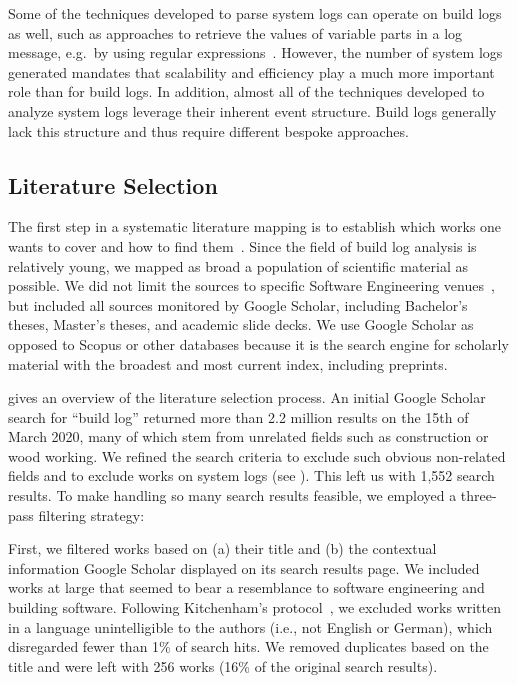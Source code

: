 Some of the techniques developed to parse system logs can operate
on build logs as well, such as approaches to retrieve the
values of variable parts in a log message, e.g.\, by using regular
expressions~\citep{nagappan2010abstracting,xu2009detecting}.
However, the number of
system logs generated mandates that scalability and efficiency play a
much more important role than for build logs.
In addition, almost all of the techniques developed to analyze system logs
leverage their inherent event structure.
Build logs generally lack this
structure and thus require different bespoke approaches.

\subsection{Literature Selection}
\label{sec:litsel}

The first step in a systematic literature mapping is to
establish which works one wants to cover and how to find
them~\citep{kitchenham2009systematic}.
Since the field of build log analysis is relatively young, we
mapped as broad a population of scientific material as possible.
We did not limit the sources to specific Software Engineering
venues~\citep{petersen2015guidelines}, but included all sources
monitored by Google Scholar, including Bachelor's theses, Master's
theses, and academic slide decks.
We use Google Scholar as opposed to Scopus or
other databases because it is the search engine for scholarly material
with
the broadest and most current index, including preprints.

 gives an overview of the literature selection
process.
An initial Google Scholar search for ``build log''
returned more than 2.2 million results on the 15th of March 2020, many
of which stem
from unrelated fields such as construction or wood working.
We refined the search criteria to exclude such obvious
non-related fields and to exclude works on system
logs (see ).
This left us with 1,552 search results.
To make handling so many search results feasible, we employed a
three-pass filtering strategy:

First, we filtered works based on (a) their title and (b) the
contextual information Google Scholar displayed on its search results
page.
We included works at large that seemed to bear a resemblance to software
engineering and building software.
Following Kitchenham's protocol~\citep{kitchenham2009systematic},
we excluded
works written in a language unintelligible to the authors
(i.e., not English or German), which disregarded fewer than 1\% of search
hits.
We removed duplicates based on the title and were
left with 256 works (16\% of the original search results).


